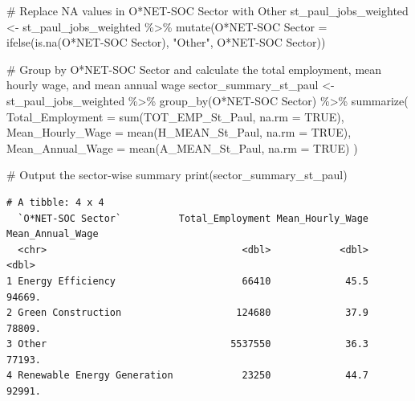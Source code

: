 \documentclass[
  letterpaper,
  DIV=11,
  numbers=noendperiod]{scrartcl}
\newenvironment{Shaded}{\begin{snugshade}}{\end{snugshade}}
\newcommand{\AttributeTok}[1]{\textcolor[rgb]{0.40,0.45,0.13}{#1}}
\newcommand{\CommentTok}[1]{\textcolor[rgb]{0.37,0.37,0.37}{#1}}
\newcommand{\ConstantTok}[1]{\textcolor[rgb]{0.56,0.35,0.01}{#1}}
\newcommand{\FunctionTok}[1]{\textcolor[rgb]{0.28,0.35,0.67}{#1}}
\newcommand{\NormalTok}[1]{\textcolor[rgb]{0.00,0.23,0.31}{#1}}
\newcommand{\OtherTok}[1]{\textcolor[rgb]{0.00,0.23,0.31}{#1}}
\newcommand{\SpecialCharTok}[1]{\textcolor[rgb]{0.37,0.37,0.37}{#1}}
\newcommand{\StringTok}[1]{\textcolor[rgb]{0.13,0.47,0.30}{#1}}
\begin{document}
\begin{Shaded}
\begin{Highlighting}[]
\CommentTok{\# Replace NA values in \textquotesingle{}O*NET{-}SOC Sector\textquotesingle{} with \textquotesingle{}Other\textquotesingle{}}
\NormalTok{st\_paul\_jobs\_weighted }\OtherTok{\textless{}{-}}\NormalTok{ st\_paul\_jobs\_weighted }\SpecialCharTok{\%\textgreater{}\%}
  \FunctionTok{mutate}\NormalTok{(}\StringTok{\textasciigrave{}}\AttributeTok{O*NET{-}SOC Sector}\StringTok{\textasciigrave{}} \OtherTok{=} \FunctionTok{ifelse}\NormalTok{(}\FunctionTok{is.na}\NormalTok{(}\StringTok{\textasciigrave{}}\AttributeTok{O*NET{-}SOC Sector}\StringTok{\textasciigrave{}}\NormalTok{), }\StringTok{"Other"}\NormalTok{, }\StringTok{\textasciigrave{}}\AttributeTok{O*NET{-}SOC Sector}\StringTok{\textasciigrave{}}\NormalTok{))}

\CommentTok{\# Group by \textquotesingle{}O*NET{-}SOC Sector\textquotesingle{} and calculate the total employment, mean hourly wage, and mean annual wage}
\NormalTok{sector\_summary\_st\_paul }\OtherTok{\textless{}{-}}\NormalTok{ st\_paul\_jobs\_weighted }\SpecialCharTok{\%\textgreater{}\%}
  \FunctionTok{group\_by}\NormalTok{(}\StringTok{\textasciigrave{}}\AttributeTok{O*NET{-}SOC Sector}\StringTok{\textasciigrave{}}\NormalTok{) }\SpecialCharTok{\%\textgreater{}\%}
  \FunctionTok{summarize}\NormalTok{(}
    \AttributeTok{Total\_Employment =} \FunctionTok{sum}\NormalTok{(TOT\_EMP\_St\_Paul, }\AttributeTok{na.rm =} \ConstantTok{TRUE}\NormalTok{),}
    \AttributeTok{Mean\_Hourly\_Wage =} \FunctionTok{mean}\NormalTok{(H\_MEAN\_St\_Paul, }\AttributeTok{na.rm =} \ConstantTok{TRUE}\NormalTok{),}
    \AttributeTok{Mean\_Annual\_Wage =} \FunctionTok{mean}\NormalTok{(A\_MEAN\_St\_Paul, }\AttributeTok{na.rm =} \ConstantTok{TRUE}\NormalTok{)}
\NormalTok{  )}

\CommentTok{\# Output the sector{-}wise summary}
\FunctionTok{print}\NormalTok{(sector\_summary\_st\_paul)}
\end{Highlighting}
\end{Shaded}

\begin{verbatim}
# A tibble: 4 x 4
  `O*NET-SOC Sector`          Total_Employment Mean_Hourly_Wage Mean_Annual_Wage
  <chr>                                  <dbl>            <dbl>            <dbl>
1 Energy Efficiency                      66410             45.5           94669.
2 Green Construction                    124680             37.9           78809.
3 Other                                5537550             36.3           77193.
4 Renewable Energy Generation            23250             44.7           92991.
\end{verbatim}
\end{document}
